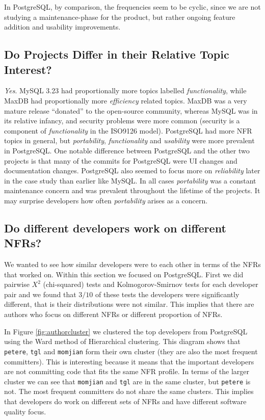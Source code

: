\documentclass[smallextended]{svjour3}       %
\begin{document}
In PostgreSQL, by comparison, the frequencies seem to be cyclic, since we are not studying a maintenance-phase for the product, but rather ongoing
feature addition and usability improvements.

\subsection{Do Projects Differ in their Relative  Topic Interest?}
\emph{Yes}. MySQL 3.23 had proportionally more
topics labelled \emph{functionality}, while MaxDB had proportionally more
\emph{efficiency} related topics. MaxDB was a very mature release ``donated'' to the open-source community, 
whereas MySQL was in its relative infancy, and	
security problems were more common (security is a component of \emph{functionality} in the ISO9126 model). 
PostgreSQL had more NFR topics in general, but \emph{portability},
\emph{functionality} and \emph{usability} were more prevalent in
PostgreSQL. One notable difference between PostgreSQL and the other
two projects is that many of the commits for PostgreSQL were UI
changes and documentation changes. PostgreSQL also seemed to focus
more on \emph{reliability} later in the case study than earlier like MySQL.
In all cases \emph{portability} was a constant maintenance concern and was prevalent throughout the lifetime of the projects. It may surprise developers
how often \emph{portability} arises as a concern.



\subsection{Do different developers work on different NFRs?}


We wanted to see how similar developers were to each other in terms of
the NFRs that worked on. 
Within this section we focused on PostgreSQL.
First we did pairwise $X^2$ (chi-squared)
tests and Kolmogorov-Smirnov tests for each developer pair and we
found that $3/10$ of these tests the developers were significantly
different, that is their distributions were not similar. This implies
that there are authors who focus on different NFRs or different
proportion of NFRs.

In Figure \ref{fig:authorcluster} we clustered the top developers from
PostgreSQL using the
Ward method of Hierarchical clustering.  This diagram shows that
\texttt{petere}, \texttt{tgl} and \texttt{momjian} form their own
cluster (they are also the most frequent committers). This is
interesting because it means that the important developers are not
committing code that fits the same NFR profile. In terms of the larger
cluster we can see that \texttt{momjian} and \texttt{tgl} are in the
same cluster, but \texttt{petere} is not. The most frequent
committers do not share the same clusters. This implies that
developers do work on different sets of NFRs and have different
software quality focus.
\end{document}
